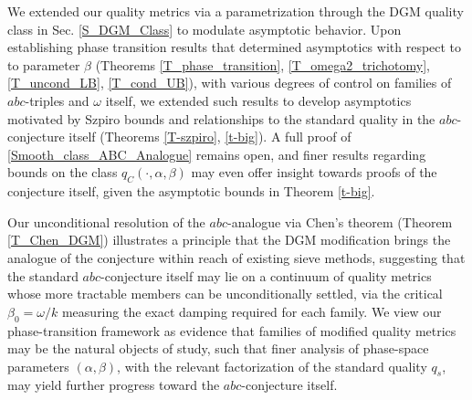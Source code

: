 \documentclass[11pt,letterpaper]{amsart}
\begin{document}
We extended our quality metrics via a parametrization through the DGM quality class in Sec. \ref{S_DGM_Class} to modulate asymptotic behavior. Upon establishing phase transition results that determined asymptotics with respect to to parameter $\beta$ (Theorems \ref{T_phase_transition}, \ref{T_omega2_trichotomy}, \ref{T_uncond_LB}, \ref{T_cond_UB}), with various degrees of control on families of $abc$-triples and $\omega$ itself, we extended such results to develop asymptotics motivated by Szpiro bounds and relationships to the standard quality in the $abc$-conjecture itself (Theorems \ref{T-szpiro}, \ref{t-big}). A full proof of \ref{Smooth_class_ABC_Analogue} remains open, and finer results regarding bounds on the class $q_C(\cdot, \alpha, \beta)$ may even offer insight towards proofs of the conjecture itself, given the asymptotic bounds in Theorem \ref{t-big}.

Our unconditional resolution of the $abc$-analogue via Chen's theorem (Theorem \ref{T_Chen_DGM}) illustrates a principle that the DGM modification brings the analogue of the conjecture within reach of existing sieve methods, suggesting that the standard $abc$-conjecture itself may lie on a continuum of quality metrics whose more tractable members can be unconditionally settled, via the critical $\beta_0 = \omega/k$ measuring the exact damping required for each family. We view our phase-transition framework as evidence that families of modified quality metrics may be the natural objects of study, such that finer analysis of phase-space parameters $(\alpha, \beta)$, with the relevant factorization of the standard quality $q_s$, may yield further progress toward the $abc$-conjecture itself.
\end{document}
